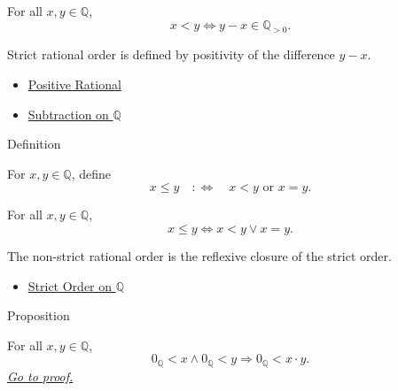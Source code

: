 \begin{remark*}
For all $x,y\in\mathbb{Q}$,
\[
x<y \Longleftrightarrow y-x\in\mathbb{Q}_{>0}.
\]
\end{remark*}

\begin{remark*}[Interpretation]
Strict rational order is defined by positivity of the difference $y-x$.
\end{remark*}

\begin{dependencies}
\begin{itemize}
  \item \hyperref[def:positive-rational]{Positive Rational}
  \item \hyperref[def:subtraction-on-q]{Subtraction on $\mathbb{Q}$}
\end{itemize}
\end{dependencies}

\begin{definitionbox}{Definition}
\begin{definition}
\label{def:order-on-q}
For $x,y\in\mathbb{Q}$, define
\[
x\le y \quad:\Longleftrightarrow\quad x<y \text{ or } x=y.
\]
\end{definition}
\end{definitionbox}

\begin{remark*}
For all $x,y\in\mathbb{Q}$,
\[
x\le y \Longleftrightarrow x<y\lor x=y.
\]
\end{remark*}

\begin{remark*}[Interpretation]
The non-strict rational order is the reflexive closure of the strict order.
\end{remark*}

\begin{dependencies}
\begin{itemize}
  \item \hyperref[def:strict-order-on-q]{Strict Order on $\mathbb{Q}$}
\end{itemize}
\end{dependencies}

\begin{propositionbox}{Proposition}
\begin{proposition}
\label{prop:product-of-positives-is-positive-q}
For all $x,y\in\mathbb{Q}$,
\[
0_{\mathbb{Q}}<x\land 0_{\mathbb{Q}}<y
\Longrightarrow
0_{\mathbb{Q}}<x\cdot y.
\]
\hyperref[prf:product-of-positives-is-positive-q]{\textit{Go to proof.}}
\end{proposition}
\end{propositionbox}

